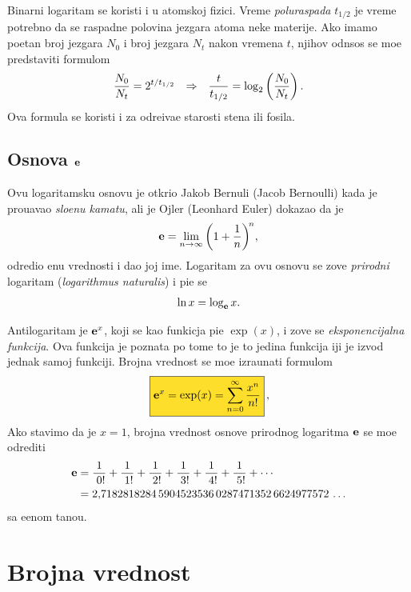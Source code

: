 \documentclass[12pt, twoside, a4paper]{article}
\def\logtwo{\log_2}
\def\.{{,}}
\def\e{{\bf e}}
\def\th{t_{1/2}}
\def\okvir#1{\,\fcolorbox{black}{Goldenrod}{$\displaystyle{\mathstrut #1}$}\,}
\def\sledi{{\quad\Rightarrow\quad}}
\begin{document}
\smallskip

Binarni logaritam se koristi i u atomskoj fizici.
Vreme {\sl poluraspada\/} $\th$ je vreme potrebno da se raspadne polovina jezgara atoma neke materije. 
Ako imamo po{\cv}etan broj jezgara $N_0$ i broj jezgara $N_t$ nakon vremena $t$, njihov odnsos
se mo{\zv}e pred\-sta\-vi\-ti formulom
\begin{equation}
\label{eq:halftime}
{N_0\over N_t}=2^{t/\th}\sledi {t\over\th}=\logtwo\left( {N_0\over N_t} \right).
\end{equation}
Ova formula se koristi i za odre{\dj}iva{\nj}e starosti stena ili fosila.



\subsection{Osnova $\e$}

Ovu logaritamsku osnovu je otkrio Jakob Bernuli (Jacob Bernoulli) kada je
prou{\cv}avao {\sl slo{\zv}enu kamatu}, ali je Ojler (Leonhard Euler) dokazao da je
$$
\e=\lim_{n\to\infty}\left(1+{1\over n}\right)^{\!n}\!,
$$
odredio {\nj}enu vrednosti i dao joj ime.
Logaritam za ovu osnovu se zove {\sl prirodni\/} logaritam ({\sl logarithmus naturalis\/})
i pi{\sv}e se
$$
\ln x=\log_\e x.
$$

\def\ep{\hphantom{!}}
Antilogaritam je $\e^x$, koji se kao funkicja pi{\sv}e $\exp(x)$, i zove se
{\sl eksponencijalna funkcija}. Ova funkcija je poznata po tome {\sv}to je to 
jedina funkcija {\cv}iji je izvod jednak samoj funkciji. Brojna vrednost se mo{\zv}e
izra{\cv}unati formulom
\begin{equation}
\label{eq:exp}
\okvir{\e^x=\exp(x)=\sum_{n=0}^\infty{x^n\over n!}},
\end{equation}
Ako stavimo da je $x=1$,
brojna vrednost osnove prirodnog logaritma $\e$ se mo{\zv}e odrediti
\begin{equation}
\label{eq:e}
\begin{aligned}
\e
&={1\over\ep0!}+{1\over\ep1!}+{1\over\ep2!}+{1\over\ep3!}+{1\over\ep4!}+{1\over\ep5!}+\cdots\\
&=2\.
7182818284\,
5904523536\,
0287471352\,
6624977572\,\ldots
\end{aligned}
\end{equation}
sa {\zv}e{\lj}enom ta{\cv}no{\sv}{\cc}u.


\section{Brojna vrednost}
\end{document}

